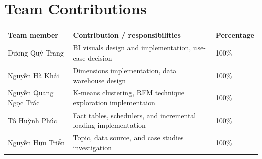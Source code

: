 \documentclass[a4paper, 12pt, notitlepage]{report}
\begin{document}
\pagestyle{fancy}



\newpage
\chapter*{Team Contributions}

\vspace{1em}
\begin{center}
\renewcommand{\arraystretch}{1.4}
\begin{tabular}{|p{5cm}|p{6.1cm}|p{3cm}|}
\hline
\textbf{Team member} & \textbf{Contribution / responsibilities} & \textbf{Percentage} \\ \hline
Dương Quý Trang & BI visuals design and implementation, use-case decision & 100\% \\ \hline
Nguyễn Hà Khải & Dimensions implementation, data warehouse design & 100\% \\ \hline
Nguyễn Quang Ngọc Trác & K-means clustering, RFM technique exploration implementaion & 100\% \\ \hline
Tô Huỳnh Phúc & Fact tables, schedulers, and incremental loading implementation & 100\% \\ \hline
Nguyễn Hữu Triển & Topic, data source, and case studies investigation  & 100\% \\ \hline
\end{tabular}
\end{center}

\newpage
\listoftables
\listoffigures

\newpage
\renewcommand{\contentsname}{Contents}
\vspace{1cm}
\tableofcontents

\newpage
{}











\newpage
\printbibliography
\end{document}
